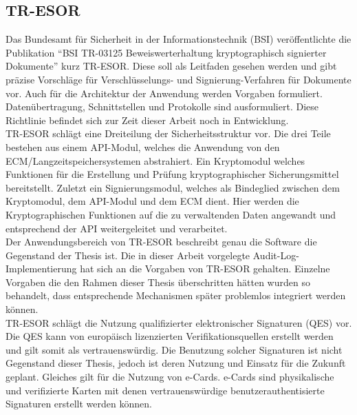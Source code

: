 \subsection{TR-ESOR}
Das Bundesamt für Sicherheit in der Informationstechnik (\acs{BSI}) veröffentlichte die Publikation "`\acs{BSI} TR-03125 Beweiswerterhaltung kryptographisch signierter Dokumente"' kurz \acs{TR-ESOR}. Diese soll als Leitfaden gesehen werden und gibt präzise Vorschläge für Verschlüsselungs- und Signierung-Verfahren für Dokumente vor. Auch für die Architektur der Anwendung werden Vorgaben formuliert. Datenübertragung, Schnittstellen und Protokolle sind ausformuliert. Diese Richtlinie befindet sich zur Zeit dieser Arbeit noch in Entwicklung. \\
\acs{TR-ESOR} schlägt eine Dreiteilung der Sicherheitsstruktur vor. Die drei Teile bestehen aus einem \acs{API}-Modul, welches die Anwendung von den \acs{ECM}/Langzeitspeichersystemen abstrahiert. Ein Kryptomodul welches Funktionen für die Erstellung und Prüfung kryptographischer Sicherungsmittel bereitstellt. Zuletzt ein Signierungsmodul, welches als Bindeglied zwischen dem Kryptomodul, dem \acs{API}-Modul und dem \acs{ECM} dient. Hier werden die Kryptographischen Funktionen auf die zu verwaltenden Daten angewandt und entsprechend der \acs{API} weitergeleitet und verarbeitet.\\
Der Anwendungsbereich von \acs{TR-ESOR} beschreibt genau die Software die Gegenstand der Thesis ist. Die in dieser Arbeit vorgelegte Audit-Log-Implementierung hat sich an die Vorgaben von \acs{TR-ESOR} gehalten. Einzelne Vorgaben die den Rahmen dieser Thesis überschritten hätten wurden so behandelt, dass entsprechende Mechanismen später problemlos integriert werden können.\\
\acs{TR-ESOR} schlägt die Nutzung qualifizierter elektronischer Signaturen (\acs{QES}) vor. Die \acs{QES} kann von europäisch lizenzierten Verifikationsquellen erstellt werden und gilt somit als vertrauenswürdig. Die Benutzung solcher Signaturen ist nicht Gegenstand dieser Thesis, jedoch ist deren Nutzung und Einsatz für die Zukunft geplant. Gleiches gilt für die Nutzung von e-Cards. e-Cards sind physikalische und verifizierte Karten mit denen vertrauenswürdige benutzerauthentisierte Signaturen erstellt werden können. \cite{2}
